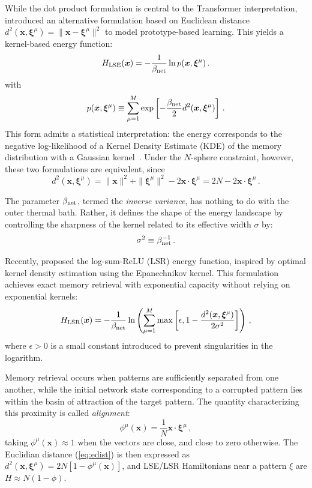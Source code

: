 \documentclass{article}
\theoremstyle{plain}
\theoremstyle{definition}
\theoremstyle{remark}
\begin{document}
While the dot product formulation is central to the Transformer interpretation, \citet{krotov2021large} introduced an alternative formulation based on Euclidean distance $d^2(\bm{x}, \bm{\xi}^\mu) = \|\bm{x}-\bm{\xi}^\mu\|^2$ to model prototype-based learning. This yields a kernel-based energy function:
\begin{equation}
    H_{\rm LSE}(\bm{x}) = -\frac{1}{\beta_{\rm net}} \ln p(\bm{x}, \bm{\xi}^\mu) \,.
    \label{eq:H_lse}
\end{equation}
with 
\begin{equation}
    p(\bm{x}, \bm{\xi}^\mu) \equiv \sum_{\mu=1}^M \exp\left[ - \frac{\beta_{\rm net}}{2} d^2(\bm{x}, \bm{\xi}^\mu) \right] \,.
    \label{eq:dens}
\end{equation}
This form admits a statistical interpretation: the energy corresponds to the negative log-likelihood of a Kernel Density Estimate (KDE) of the memory distribution with a Gaussian kernel~\cite{hoover2025dense}. Under the $N$-sphere constraint, however, these two formulations are  equivalent, since 
\begin{equation}
    d^2(\bm{x}, \bm{\xi}^\mu) = \|\bm{x}\|^2 + \|\bm{\xi}^\mu\|^2 - 2\bm{x} \cdot \bm{\xi}^\mu = 2N - 2\bm{x} \cdot \bm{\xi}^\mu \,.
    \label{eq:edist}
\end{equation}

The parameter $\beta_{\rm net}$, termed the {\it inverse variance}, has nothing to do with the outer thermal bath. Rather, it defines the shape of the energy landscape by controlling the sharpness of the kernel related to its effective width $\sigma$ by:
\begin{equation}
    \sigma^2 \equiv \beta_{\rm net}^{-1} \,.
\end{equation}

Recently, \citet{hoover2025dense} proposed the log-sum-ReLU (LSR) energy function, inspired by optimal kernel density estimation using the Epanechnikov kernel. This formulation achieves exact memory retrieval with exponential capacity without relying on exponential kernels:
\begin{equation}
    H_{\rm LSR}(\bm{x}) = -\frac{1}{\beta_{\rm net}} \ln \left( \sum_{\mu=1}^M \max\left[\epsilon,  1 - \frac{d^2(\bm{x},\bm{\xi}^\mu)}{2\sigma^2} \right] \right) \,,
    \label{eq:H_lsr}
\end{equation}
where $\epsilon > 0$ is a small constant introduced to prevent singularities in the logarithm.

Memory retrieval occurs when patterns are sufficiently separated from one another, while the initial network state corresponding to a corrupted pattern lies within the basin of attraction of the target pattern. The quantity characterizing this proximity is called \textit{alignment}:
\begin{equation}
    \phi^\mu(\bm{x}) = \frac{1}{N} \bm{x} \cdot \bm{\xi}^\mu\,,
    \label{eq:alignment}
\end{equation}
taking $\phi^\mu(\bm{x}) \approx 1$ when the vectors are close, and close to zero otherwise. The Euclidian distance (\ref{eq:edist}) is then expressed as $d^2(\bm{x}, \bm{\xi}^\mu) =2N [1- \phi^\mu(\bm{x}) ]$, and 
LSE/LSR Hamiltonians near a pattern $\xi$ are $H\approx N(1-\phi)$.
\end{document}
